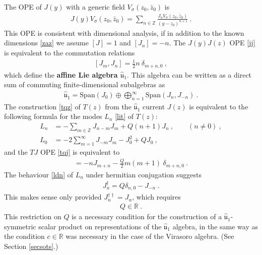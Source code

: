\documentclass[12pt, a4paper, notitlepage, twoside]{report}
\numberwithin{equation}{section}
\theoremstyle{break}
\begin{document}
The OPE of $J(y)$ with a generic field $V_\sigma(z_0,\bar{z}_0)$ is 
\begin{align}
 \boxed{J(y) V_\sigma(z_0,\bar{z}_0) = \sum_{n\in {\mathbb{Z}}} \frac{J_n V_\sigma(z_0,\bar{z}_0)}{(y-z_0)^{n+1}}}\ .
\label{jvn}
\end{align}
This OPE is consistent with dimensional analysis, if in addition to the known dimensions \eqref{zaz} we assume $[J]=1$ and $[J_n]=-n$.
The $J(y)J(z)$ OPE \eqref{jj} is equivalent to the commutation relations
\begin{align}
 \boxed{ [J_m,J_n] =  \frac12 n\ \delta_{m+n,0}}\ ,
\label{jmjn}
\end{align}
which define the  \textbf{\boldmath affine Lie algebra $\hat{\mathfrak{u}}_1$}.
This algebra can be written as a direct sum of commuting finite-dimensional subalgebras as 
\begin{align}
 \hat{\mathfrak{u}}_1 = \text{Span}(J_0) \oplus \bigoplus_{n=1}^\infty \text{Span}(J_n,J_{-n}) \ .
\end{align}
The construction \eqref{tqz} of $T(z)$ from the $\hat{\mathfrak{u}}_1$ current $J(z)$ is equivalent to the following formula for the modes $L_n$ \eqref{lit} of $T(z)$:
\begin{align}
 L_n &= -\sum_{m\in{\mathbb{Z}}} J_{n-m}J_m + Q(n+1)J_n\ , \qquad (n\neq 0)\ ,
\label{lnj}
\\
L_0 &=-2\sum_{m=1}^\infty J_{-m}J_m -J_0^2+QJ_0 \ ,
\label{lzj}
\end{align}
and the $TJ$ OPE \eqref{tqj} is equivalent to 
\begin{align}
 [L_m,J_n] = -nJ_{m+n} -\frac{Q}{2}m(m+1)\ \delta_{m+n,0} \ . 
\end{align}
The behaviour \eqref{ldn} of $L_n$ under hermitian conjugation suggests 
\begin{align}
 J_n^\dagger = Q\delta_{n,0}-J_{-n}\ .
\label{jdq}
\end{align}
This makes sense only provided $J_n^{\dagger \dagger} =J_n$, which requires 
\begin{align}
 Q \in {\mathbb{R}} \ .
\label{qir}
\end{align}
This restriction on $Q$ is a necessary condition for the construction of a $\hat{\mathfrak{u}}_1$-symmetric scalar product on representations of the $\hat{\mathfrak{u}}_1$ algebra, in the same way as the condition $c\in {\mathbb{R}}$ was necessary in the case of the Virasoro algebra. (See Section \ref{secsots}.)
\end{document}
